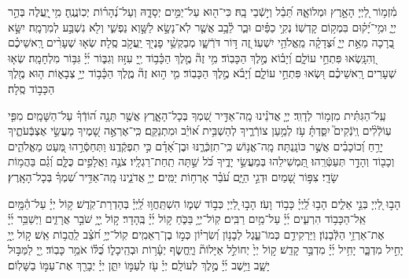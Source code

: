 \documentclass[twoside, openany, parskip=half, 11pt]{book}
\begin{document}
\begin{small}
  מִ֫זְמ֥וֹר
לַ֭יְיָ הָאָ֣רֶץ וּמְלוֹאָ֑הּ תֵּ֝בֵ֗ל וְי֣שְֿׁבֵי בָֽהּ׃ 
כִּי־ה֖וּא עַל־יַמִּ֣ים יְסָדָ֑הּ וְעַל־נְ֝הָר֗וֹת יְכֽוֹנֲנֶֽהָ׃ 
מִ֥י ֖יַֽעֲלֶה בְּהַ֣ר יְיָ֑ וּמִ֥י־יָ֝ק֗וּם בִּמְק֥וֹם קָדְשֽׁוֹ׃
נְקִ֥י כַפַּ֗יִם וּבַ֢ר לֵ֫בָ֥ב אֲשֶׁ֤ר לֹֽא־נָשָׂ֣א לַשָּׁ֣וְא נַפְשִׁ֑י וְלֹ֖א נִשְׁבַּ֣ע לְמִרְמָֽה׃ 
יִשָּׂ֣א בְ֭רָכָה מֵאֵ֣ת יְיָ֑ וּ֝צְדָקָ֗ה מֵֽאֱלֹהֵ֥י יִשְׁעֽוֹ׃ 
זֶ֭ה דּ֣וֹר דֹּרְֿשָׁ֑ו מְבַקְשֵׁ֥֨י פָנֶי֖ךָ יַֽעֲקֹ֣ב סֶֽלָה׃ 
שְׂא֤וּ שְׁעָרִ֨ים רָֽאשֵׁיכֶ֗ם וְ֭הִנָּֽשְׂאוּ פִּתְחֵ֣י עוֹלָ֑ם וְ֝יָב֗וֹא מֶ֣לֶךְ הַכָּבֽוֹד׃ 
מִ֥י זֶה֘ מֶ֤לֶךְ הַכָּ֫ב֥וֹד יְ֖יָ עִזּ֣וּז וְגִבּ֑וֹר יְ֜יָ֗ גִּבּ֥וֹר מִלְחָמָֽה׃ 
שְׂא֤וּ שְׁעָרִים רָֽאשֵׁיכֶ֗ם וּ֭שְׂאוּ פִּתְחֵ֣י עוֹלָ֑ם וְ֝יָבֹ֗א מֶ֣לֶךְ הַכָּבֽוֹד׃ 
מִ֤י ה֣וּא זֶה֘ מֶ֢לֶךְ הַכָּ֫ב֥וֹד יְיָ֥ צְבָא֑וֹת ה֤וּא מֶ֖לֶךְ הַכָּב֣וֹד סֶֽלָה׃


 עַֽל־הַגִּתִּ֗ית מִזְמ֥וֹר לְדָוִֽד׃
 יְיָ֤ אֲדֹנֵ֗ינוּ מָֽה־אַדִּ֣יר שִׁ֭מְךָ בְּכָל־הָאָ֑רֶץ אֲשֶׁ֥ר תְּנָ֥ה ה֝וֹדְֿךָ֗ עַל־הַשָּׁמָֽיִם׃
  מִפִּ֤י עֽוֹלְֿלִ֨ים וְֽיֹנְֿקִים֮ יִסַּ֪דְתָּ֫ עֹ֥ז לְמַ֥עַן צוֹרְֿרֶ֑יךָ לְהַשְׁבִּ֥ית א֝וֹיֵ֗ב וּמִתְנַקֵּֽם׃
   כִּֽי־אֶרְאֶ֣ה שָׁ֭מֶיךָ מַעֲשֵׂ֣י אֶצְבְּֿעֹתֶ֑יךָ יָרֵ֥חַ וְ֝כוֹכָבִ֗ים אֲשֶׁ֣ר כּוֹנָֽנְתָּה׃
    מָֽה־אֱנ֥וֹשׁ כִּֽי־תִזְכְּֿרֶ֑נּוּ וּבֶן־אָ֝דָ֗ם כִּ֣י תִפְקְֿדֶֽנּוּ׃
     וַתְּחַסְּֿרֵ֣הוּ מְּ֭עַט מֵאֱלֹהִ֑ים וְכָב֖וֹד וְהָדָ֣ר תְּעַטְּֿרֵֽהוּ׃
      תַּ֭מְשִׁילֵהוּ בְּמַעֲשֵׂ֣י יָדֶ֑יךָ כֹּ֝ל שַׁ֣תָּה תַֽחַת־רַגְלָֽיו׃
       צֹנֶ֣ה וַאֲלָפִ֣ים כֻּלָּ֑ם וְ֝גַ֗ם בַּהֲמ֥וֹת שָׂדָֽי׃
        צִפּ֣וֹר שָׁ֭מַיִם וּדְגֵ֣י הַיָּ֑ם עֹ֝בֵ֗ר אָרְח֥וֹת יַמִּֽים׃
         יְיָ֥ אֲדֹנֵ֑ינוּ מָֽה־אַדִּ֥יר שִׁ֝מְךָ֗ בְּכָל־הָאָֽרֶץ׃



הָב֣וּ לַ֭יְיָ בְּנֵ֣י אֵלִ֑ים הָב֥וּ לַֽ֝יְיָ֗ כָּב֥וֹד וָעֹֽז׃ 
הָב֣וּ לַ֭יְיָ כְּב֣וֹד שְׁמ֑וֹ הִשְׁתַּֽחֲו֥וּ לַֽ֝יְיָ֗ בְּהַדְרַת־קֹֽדֶשׁ׃ 
ק֥וֹל יְיָ֗ עַל־הַ֫מָּ֥יִם אֵֽל־הַכָּב֥וֹד הִרְעִ֑ים יְ֜יָ֗ עַל־מַ֥יִם רַבִּֽים׃ 
קֽוֹל־יְיָ֥ בַּכֹּ֑חַ ק֥וֹל יְ֜יָ֗ בֶּֽהָדָר׃ 
ק֣וֹל יְ֖יָ֥ שֹׁבֵ֣ר אֲרָזִ֑ים וַיְשַׁבֵּ֥ר יְ֜יָ֗ אֶת־אַרְזֵ֥י הַלְּֿבָנֽוֹן׃ 
וַיַּרְקִידֵ֥ם כְּמוֹ־עֵ֑גֶל לְבָנ֥וֹן וְ֝שִׂרְי֗וֹן כְּמ֣וֹ בֶן־רְאֵמִֽים׃ 
קֽוֹל־יְיָ֥ חֹ֝צֵ֗ב לַֽהֲב֥וֹת אֵֽשׁ׃ 
ק֣וֹל יְ֖יָ֥ יָחִ֣יל מִדְבָּ֑ר יָחִ֥יל יְ֜יָ֗ מִדְבַּ֣ר קָדֵֽשׁ׃ 
ק֣וֹל יְיָ֙ יְחוֹלֵ֣ל אַיָּלוֹת֘ וַיֶּֽחֱשׂ֢ף יְעָ֫ר֥וֹת וּבְהֵֽיכָל֑וֹ כֻּ֝לּ֗וֹ אֹמֵ֥ר כָּבֽוֹד׃ 
יְ֖יָ לַמַּבּ֣וּל יָשָׁ֑ב וַיֵּ֥שֶׁב יְ֜יָ֗ מֶ֣לֶךְ לְעוֹלָֽם׃ 
יְיָ֗ עֹ֖ז לְעַמּ֣וֹ יִתֵּ֑ן יְיָ֓ יְבָרֵ֖ךְ אֶת־עַמּ֣וֹ בַשָּׁלֽוֹם׃

\end{small}
\end{document}
